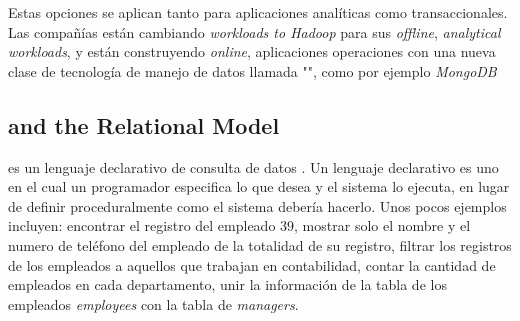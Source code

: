 Estas opciones se aplican tanto para aplicaciones analíticas como transaccionales. Las compañías están cambiando \textit{workloads to Hadoop} para sus \textit{offline}, \textit{analytical workloads}, y están construyendo \textit{online}, aplicaciones operaciones con una nueva clase de tecnología de manejo de datos llamada "", como por ejemplo \textit{MongoDB}

\subsection{ and the Relational Model}

 es un lenguaje declarativo de consulta de datos . Un lenguaje declarativo es uno en el cual un programador especifica lo que desea y el sistema lo ejecuta, en lugar de definir proceduralmente como el sistema debería hacerlo. Unos pocos ejemplos incluyen: encontrar el registro del empleado 39, mostrar solo el nombre y el numero de teléfono del empleado de la totalidad de su registro, filtrar los registros de los empleados a aquellos que trabajan en contabilidad, contar la cantidad de empleados en cada departamento, unir la información de la tabla de los empleados \textit{employees} con la tabla de \textit{managers}.


